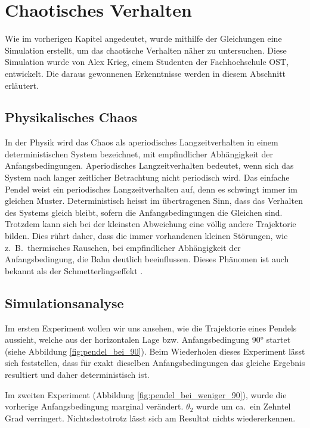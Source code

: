 \section{Chaotisches Verhalten}
Wie im vorherigen Kapitel angedeutet, wurde mithilfe der Gleichungen eine Simulation erstellt,
um das chaotische Verhalten näher zu untersuchen.
Diese Simulation wurde von Alex Krieg, einem Studenten der Fachhochschule OST, entwickelt.
%
%
Die daraus gewonnenen Erkenntnisse werden in diesem Abschnitt erläutert.


\subsection{Physikalisches Chaos}
In der Physik wird das Chaos als aperiodisches Langzeitverhalten in einem deterministischen
%
%
System bezeichnet, mit empfindlicher Abhängigkeit der Anfangsbedingungen.
%
%
Aperiodisches Langzeitverhalten bedeutet, wenn sich das System nach langer zeitlicher Betrachtung
nicht periodisch wird.
Das einfache Pendel weist ein periodisches Langzeitverhalten auf,
denn es schwingt immer im gleichen Muster.
Deterministisch heisst im übertragenen Sinn, dass das Verhalten des Systems gleich bleibt,
sofern die Anfangsbedingungen die Gleichen sind.
Trotzdem kann sich bei der kleinsten Abweichung eine völlig andere Trajektorie bilden.
Dies rührt daher, dass die immer vorhandenen kleinen Störungen, wie z.~B.~thermisches Rauschen,
%
%
bei empfindlicher Abhängigkeit der Anfangsbedingung, die Bahn deutlich beeinflussen.
Dieses Phänomen ist auch bekannt als der Schmetterlingseffekt \cite{doppelpendel:schmetterlingseffekt}.
%

\subsection{Simulationsanalyse}
Im ersten Experiment wollen wir uns ansehen, wie die Trajektorie eines Pendels aussieht,
welche aus der horizontalen Lage bzw. Anfangsbedingung 90° startet
(siehe Abbildung \ref{fig:pendel_bei_90}).
Beim Wiederholen dieses Experiment lässt sich feststellen, dass für exakt dieselben Anfangsbedingungen
das gleiche Ergebnis resultiert und daher deterministisch ist.

Im zweiten Experiment (Abbildung \ref{fig:pendel_bei_weniger_90}), wurde die vorherige
Anfangsbedingung marginal verändert.
\(\theta_2\) wurde um ca.~ein Zehntel Grad verringert.
Nichtsdestotrotz lässt sich am Resultat nichts wiedererkennen.

